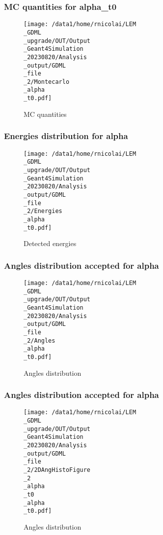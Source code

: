 \documentclass[8pt]{beamer}
\begin{document}
            \begin{frame}
                \frametitle{MC quantities for alpha\_t0}
            
        \begin{figure}[h]
            \centering
            \texttt{[image: /data1/home/rnicolai/LEM\\\_GDML\\\_upgrade/OUT/Output\\\_Geant4Simulation\\\_20230820/Analysis\\\_output/GDML\\\_file\\\_2/Montecarlo\\\_alpha\\\_t0.pdf]}
            \caption{MC quantities}
        \end{figure}
        
            \end{frame}
            
            \begin{frame}
                \frametitle{Energies distribution for alpha}
            
        \begin{figure}[h]
            \centering
            \texttt{[image: /data1/home/rnicolai/LEM\\\_GDML\\\_upgrade/OUT/Output\\\_Geant4Simulation\\\_20230820/Analysis\\\_output/GDML\\\_file\\\_2/Energies\\\_alpha\\\_t0.pdf]}
            \caption{Detected energies}
        \end{figure}
        
            \end{frame}
            
            \begin{frame}
                \frametitle{Angles distribution accepted for alpha}
            
        \begin{figure}[h]
            \centering
            \texttt{[image: /data1/home/rnicolai/LEM\\\_GDML\\\_upgrade/OUT/Output\\\_Geant4Simulation\\\_20230820/Analysis\\\_output/GDML\\\_file\\\_2/Angles\\\_alpha\\\_t0.pdf]}
            \caption{Angles distribution}
        \end{figure}
        
            \end{frame}
            
            \begin{frame}
                \frametitle{Angles distribution accepted for alpha}
            
        \begin{figure}[h]
            \centering
            \texttt{[image: /data1/home/rnicolai/LEM\\\_GDML\\\_upgrade/OUT/Output\\\_Geant4Simulation\\\_20230820/Analysis\\\_output/GDML\\\_file\\\_2/2DAngHistoFigure\\\_2\\\_alpha\\\_t0\\\_alpha\\\_t0.pdf]}
            \caption{Angles distribution}
        \end{figure}
        
            \end{frame}
            
\end{document}
